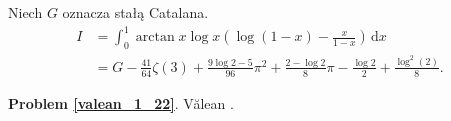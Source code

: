 %

\begin{problem_with_solution}
    \label{valean_1_22}%
    Niech $G$ oznacza stałą Catalana.
    \begin{align}
        I & = \int_0^1 \arctan x \log x \left(\log (1-x) - \frac {x}{1-x}\right) \,\mathrm{d} x \\
        & = G - \frac{41}{64} \zeta (3) + \frac{9 \log 2 - 5}{96} \pi^2 + \frac{2 - \log 2}{8} \pi - \frac {\log 2}{2} + \frac{\log^2 (2)}{8}.
    \end{align} 
\end{problem_with_solution}



\textbf{Problem \ref{valean_1_22}}.
Vălean \cite[s. 13]{nahin15}.


%